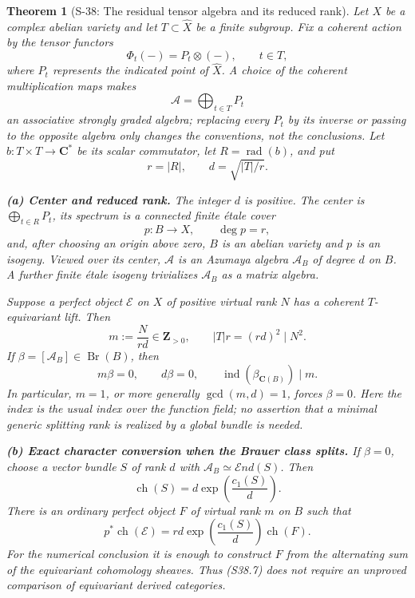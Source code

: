\documentclass[11pt,a4paper]{article}
\newtheorem{theorem}{Theorem}[section]
\theoremstyle{definition}
\begin{document}
\begin{theorem}[S-38: The residual tensor algebra and its reduced rank]
\label{thm:semireg-residual-tensor-rank}
Let \(X\) be a complex abelian variety and let \(T\subset\widehat X\) be a finite subgroup. Fix a coherent action by the tensor functors \[
 \Phi_t(-)=P_t\otimes(-),\qquad t\in T,
\] where \(P_t\) represents the indicated point of \(\widehat X\). A choice of the coherent multiplication maps makes \[
 \mathscr A=\bigoplus_{t\in T}P_t
 \tag{S38.1}
\] an associative strongly graded algebra; replacing every \(P_t\) by its inverse or passing to the opposite algebra only changes the conventions, not the conclusions. Let \(b:T\times T\to\mathbf C^*\) be its scalar commutator, let \(R=\operatorname{rad}(b)\), and put \[
 r=|R|,\qquad d=\sqrt{|T|/r}.
 \tag{S38.2}
\]

\textbf{(a) Center and reduced rank.} The integer \(d\) is positive. The center is \(\bigoplus_{t\in R}P_t\), its spectrum is a connected finite étale cover \[
 p:B\longrightarrow X,\qquad\deg p=r,
 \tag{S38.3}
\] and, after choosing an origin above zero, \(B\) is an abelian variety and \(p\) is an isogeny. Viewed over its center, \(\mathscr A\) is an Azumaya algebra \(\mathscr A_B\) of degree \(d\) on \(B\). A further finite étale isogeny trivializes \(\mathscr A_B\) as a matrix algebra.

Suppose a perfect object \(\mathcal E\) on \(X\) of positive virtual rank \(N\) has a coherent \(T\)-equivariant lift. Then \[
 m:=\frac{N}{rd}\in\mathbf Z_{>0},\qquad
 |T|r=(rd)^2\mid N^2.
 \tag{S38.4}
\] If \(\beta=[\mathscr A_B]\in\operatorname{Br}(B)\), then \[
 m\beta=0,\qquad d\beta=0,
 \qquad\operatorname{ind}(\beta_{\mathbf C(B)})\mid m.
 \tag{S38.5}
\] In particular, \(m=1\), or more generally \(\gcd(m,d)=1\), forces \(\beta=0\). Here the index is the usual index over the function field; no assertion that a minimal generic splitting rank is realized by a global bundle is needed.

\textbf{(b) Exact character conversion when the Brauer class splits.} If \(\beta=0\), choose a vector bundle \(S\) of rank \(d\) with \(\mathscr A_B\simeq\mathcal End(S)\). Then \[
 \operatorname{ch}(S)=d\exp\!\left(\frac{c_1(S)}d\right).
 \tag{S38.6}
\] There is an ordinary perfect object \(F\) of virtual rank \(m\) on \(B\) such that \[
 p^*\operatorname{ch}(\mathcal E)
       =rd\exp\!\left(\frac{c_1(S)}d\right)\operatorname{ch}(F).
 \tag{S38.7}
\] For the numerical conclusion it is enough to construct \(F\) from the alternating sum of the equivariant cohomology sheaves. Thus (S38.7) does not require an unproved comparison of equivariant derived categories.


\end{theorem}
\end{document}

